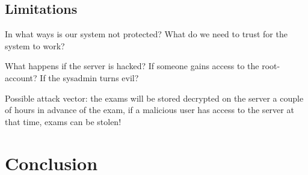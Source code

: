 \documentclass[12pt]{article}
\begin{document}
\subsection{Limitations}
\label{subsec:req-limitations}


In what ways is our system not protected? What do we need to trust for the
system to work?

What happens if the server is hacked? If someone gains access to the
root-account? If the sysadmin turns evil?

Possible attack vector: the exams will be stored decrypted on the server a
couple of hours in advance of the exam, if a malicious user has access to the
server at that time, exams can be stolen!

\section{Conclusion}
\label{sec:conclusion}

\end{document}

